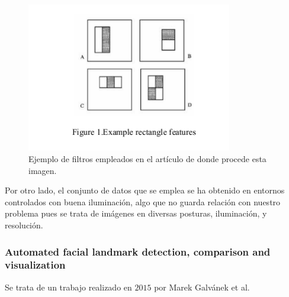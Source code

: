                 \begin{figure}[!h]
                    \centering
                    \includegraphics[width=0.8\textwidth]{img/caracteristicas_haar.png}
                    \caption{Ejemplo de filtros empleados en el artículo \cite{asi2014automatic} de donde procede esta imagen.}
                    \label{fig:asi2014}
                \end{figure}

                \medskip

                \noindent Por otro lado, el conjunto de datos que se emplea se ha obtenido en entornos controlados con buena iluminación, algo que no guarda relación con nuestro problema pues se trata de imágenes en diversas posturas, iluminación, y resolución.

            \subsubsection{Automated facial landmark detection, comparison and visualization}
                \noindent Se trata de un trabajo realizado en $2015$ por Marek Galvánek et al. 

            

            










\endinput


